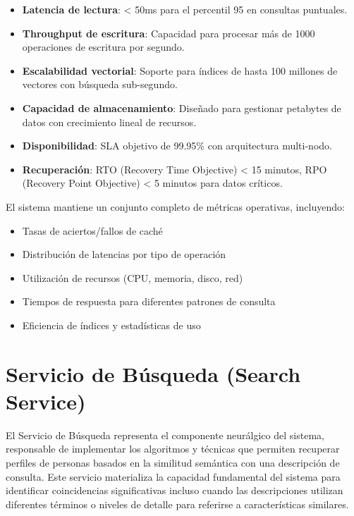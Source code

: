\documentclass[12pt,a4paper]{article}
\begin{document}
\begin{itemize}
    \item \textbf{Latencia de lectura}: < 50ms para el percentil 95 en consultas puntuales.
    
    \item \textbf{Throughput de escritura}: Capacidad para procesar más de 1000 operaciones de escritura por segundo.
    
    \item \textbf{Escalabilidad vectorial}: Soporte para índices de hasta 100 millones de vectores con búsqueda sub-segundo.
    
    \item \textbf{Capacidad de almacenamiento}: Diseñado para gestionar petabytes de datos con crecimiento lineal de recursos.
    
    \item \textbf{Disponibilidad}: SLA objetivo de 99.95\% con arquitectura multi-nodo.
    
    \item \textbf{Recuperación}: RTO (Recovery Time Objective) < 15 minutos, RPO (Recovery Point Objective) < 5 minutos para datos críticos.
\end{itemize}

El sistema mantiene un conjunto completo de métricas operativas, incluyendo:
\begin{itemize}
    \item Tasas de aciertos/fallos de caché
    \item Distribución de latencias por tipo de operación
    \item Utilización de recursos (CPU, memoria, disco, red)
    \item Tiempos de respuesta para diferentes patrones de consulta
    \item Eficiencia de índices y estadísticas de uso
\end{itemize}

\section{Servicio de Búsqueda (Search Service)}
\label{sec:search-service}

El Servicio de Búsqueda representa el componente neurálgico del sistema, responsable de implementar los algoritmos y técnicas que permiten recuperar perfiles de personas basados en la similitud semántica con una descripción de consulta. Este servicio materializa la capacidad fundamental del sistema para identificar coincidencias significativas incluso cuando las descripciones utilizan diferentes términos o niveles de detalle para referirse a características similares.
\end{document}
